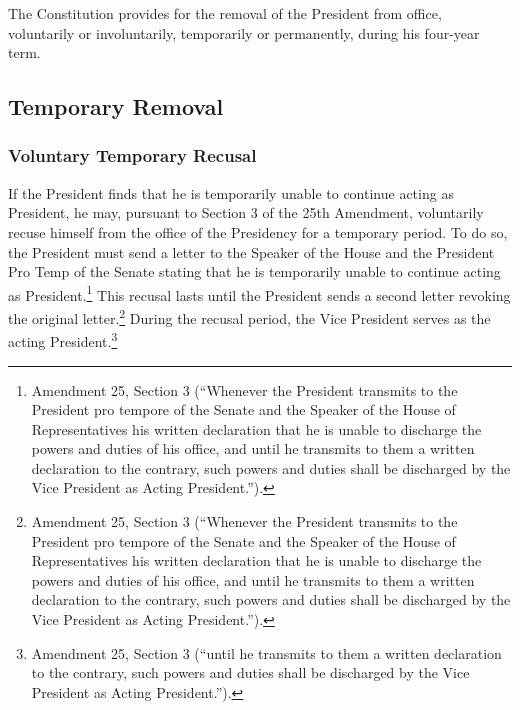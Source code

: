 The Constitution provides for the removal of the President from office, voluntarily or involuntarily, temporarily or permanently, during his four-year term.

\subsection{Temporary Removal}

\subsubsection{Voluntary Temporary Recusal}
If the President finds that he is temporarily unable to continue acting as President, he may, pursuant to Section 3 of the 25th Amendment, voluntarily recuse himself from the office of the Presidency for a temporary period.  To do so, the President must send a letter to the Speaker of the House and the President Pro Temp of the Senate stating that he is temporarily unable to continue acting as President.\footnote{Amendment 25, Section 3 (``Whenever the President transmits to the President pro tempore of the Senate and the Speaker of the House of Representatives his written declaration that he is unable to discharge the powers and duties of his office, and until he transmits to them a written declaration to the contrary, such powers and duties shall be discharged by the Vice President as Acting President.'').}
This recusal lasts until the President sends a second letter revoking the original letter.\footnote{Amendment 25, Section 3 (``Whenever the President transmits to the President pro tempore of the Senate and the Speaker of the House of Representatives his written declaration that he is unable to discharge the powers and duties of his office, and until he transmits to them a written declaration to the contrary, such powers and duties shall be discharged by the Vice President as Acting President.'').}  During the recusal period, the Vice President serves as the acting President.\footnote{Amendment 25, Section 3 (``until he transmits to them a written declaration to the contrary, such powers and duties shall be discharged by the Vice President as Acting President.'').}

